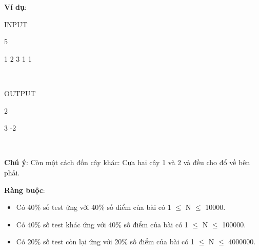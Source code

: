 \textbf{Ví dụ}:

INPUT

5

1 2 3 1 1

 

OUTPUT

2

3 -2

 

\textbf{Chú ý}: Còn một cách đốn cây khác: Cưa hai cây 1 và 2 và đều cho đổ về bên phải.

\textbf{Ràng buộc}:
\begin{itemize}
	\item Có 40\% số test ứng với 40\% số điểm của bài có 1  $\le$  N  $\le$  10000.
	\item Có 40\% số test khác ứng với 40\% số điểm của bài có 1  $\le$  N  $\le$  100000.
	\item Có 20\% số test còn lại ứng với 20\% số điểm của bài có 1  $\le$  N  $\le$  4000000.
\end{itemize}
